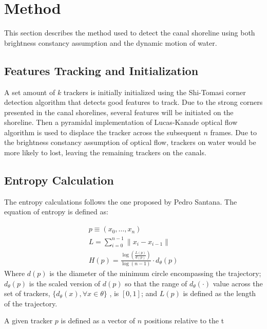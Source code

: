 \documentclass{article}
\begin{document}
\section{Method}
This section describes the method used to detect the canal shoreline using both brightness constancy assumption and the dynamic motion of water.
\subsection{Features Tracking and Initialization}
A set amount of $k$ trackers is initially initialized using the Shi-Tomasi corner detection algorithm that detects good features to track. Due to the strong corners presented in the canal shorelines, several features will be initiated on the shoreline. Then a pyramidal implementation of Lucas-Kanade optical flow algorithm is used to displace the tracker across the subsequent $n$ frames. Due to the brightness constancy assumption of optical flow, trackers on water would be more likely to lost, leaving the remaining trackers on the canals.
\subsection{Entropy Calculation} 
The entropy calculations follows the one proposed by Pedro Santana. The equation of entropy is defined as:

\begin{align}
p \equiv (x_0,\ldots,x_n)\\
L = \sum_{i=0}^{n-1} \| x_i - x_{i-1} \| \\
H(p) = \frac{\log(\frac{L(p)}{d(p)})}{\log(n-1)}\cdot d_\theta (p)
\end{align}
Where $d(p)$ is the diameter of the minimum circle encompassing the trajectory; $d_\theta(p)$ is the scaled version of $d(p)$ so that the range of $d_\theta(\cdot)$ value across the set of trackers, $\{ d_\theta (x), \forall x \in \theta \}$ , is $[0,1]$; and $L(p)$ is defined as the length of the trajectory.

A given tracker $p$ is defined as a vector of $n$ positions relative to the t
\end{document}
